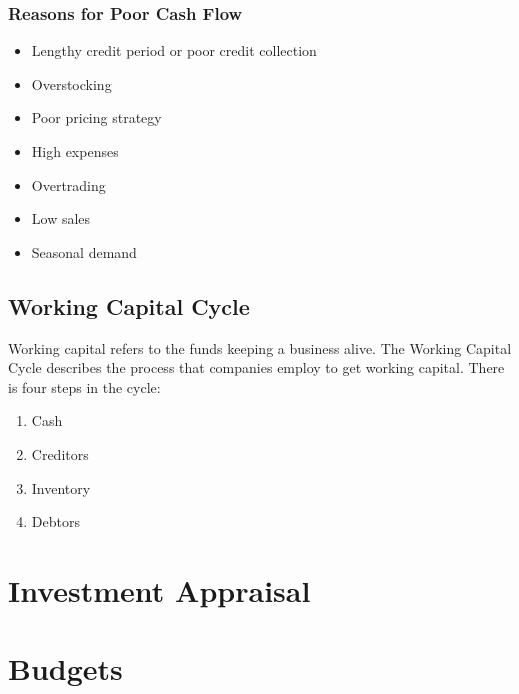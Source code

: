 \documentclass{standalone}
\begin{document}
\subsubsection{Reasons for Poor Cash Flow}
\begin{itemize}
    \item Lengthy credit period or poor credit collection
    \item Overstocking
    \item Poor pricing strategy
    \item High expenses
    \item Overtrading
    \item Low sales
    \item Seasonal demand
\end{itemize}

\subsection{Working Capital Cycle}
Working capital refers to the funds keeping a business alive.
The Working Capital Cycle describes the process that companies employ to get working capital.
There is four steps in the cycle:
\begin{enumerate}
    \item Cash
    \item Creditors
    \item Inventory
    \item Debtors
\end{enumerate}

\section{Investment Appraisal}

\section{Budgets}
\end{document}
